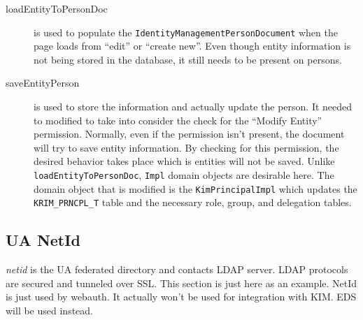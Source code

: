 \documentclass[12pt,notitlepage]{article}
\begin{document}
\begin{description}
\item[loadEntityToPersonDoc] is used to populate the \verb|IdentityManagementPersonDocument| when the
page loads from ``edit'' or ``create new''. Even though entity information is not being stored in the database,
it still needs to be present on persons.

\item[saveEntityPerson] is used to store the information and actually update the person. It needed to modified to 
take into consider the check for the ``Modify Entity'' permission. Normally, even if the permission isn't present,
the document will try to save entity information. By checking for this permission, the desired behavior takes
place which is entities will not be saved. Unlike \verb|loadEntityToPersonDoc|, \verb|Impl| domain objects are 
desirable here. The domain object that is modified is the \verb|KimPrincipalImpl| which updates the \verb|KRIM_PRNCPL_T|
table and the necessary role, group, and delegation tables.

\end{description}


\subsection{UA NetId}

\emph{netid} is the UA federated directory and contacts LDAP server. LDAP protocols are secured and tunneled over SSL.
This section is just here as an example. NetId is just used by webauth. It actually won't be used for integration
with KIM. EDS will be used instead.
\end{document}
